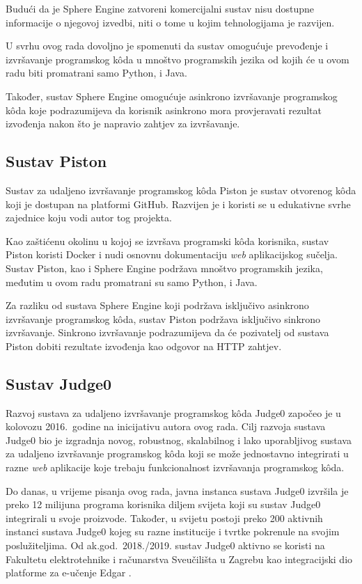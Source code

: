 \documentclass[times, utf8, diplomski]{fer}
\begin{document}
Budući da je Sphere Engine zatvoreni komercijalni sustav nisu dostupne informacije o njegovoj izvedbi, niti o tome u kojim tehnologijama je razvijen.

U svrhu ovog rada dovoljno je spomenuti da sustav omogućuje prevođenje i izvršavanje programskog kôda u mnoštvo programskih jezika od kojih će u ovom radu biti promatrani samo Python,  i Java.

Također, sustav Sphere Engine omogućuje asinkrono izvršavanje programskog kôda koje podrazumijeva da korisnik asinkrono mora provjeravati rezultat izvođenja nakon što je napravio zahtjev za izvršavanje.

\subsection{Sustav Piston}
Sustav za udaljeno izvršavanje programskog kôda Piston \citep{Piston} je sustav otvorenog kôda koji je dostupan na platformi GitHub. Razvijen je i koristi se u edukativne svrhe zajednice koju vodi autor tog projekta.

Kao zaštićenu okolinu u kojoj se izvršava programski kôda korisnika, sustav Piston koristi Docker \citep{merkel2014docker} i nudi osnovnu dokumentaciju \textit{web} aplikacijskog sučelja. Sustav Piston, kao i Sphere Engine podržava mnoštvo programskih jezika, međutim u ovom radu promatrani su samo Python,  i Java.

Za razliku od sustava Sphere Engine koji podržava isključivo asinkrono izvršavanje programskog kôda, sustav Piston podržava isključivo sinkrono izvršavanje. Sinkrono izvršavanje podrazumijeva da će pozivatelj od sustava Piston dobiti rezultate izvođenja kao odgovor na HTTP zahtjev.

\subsection{Sustav Judge0}
Razvoj sustava za udaljeno izvršavanje programskog kôda Judge0 \citep{9245310} započeo je u kolovozu 2016.\ godine na inicijativu autora ovog rada. Cilj razvoja sustava Judge0 bio je izgradnja novog, robustnog, skalabilnog i lako uporabljivog sustava za udaljeno izvršavanje programskog kôda koji se može jednostavno integrirati u razne \textit{web} aplikacije koje trebaju funkcionalnost izvršavanja programskog kôda.

Do danas, u vrijeme pisanja ovog rada, javna instanca sustava Judge0 izvršila je preko 12 milijuna programa korisnika diljem svijeta koji su sustav Judge0 integrirali u svoje proizvode. Također, u svijetu postoji preko 200 aktivnih instanci sustava Judge0 kojeg su razne institucije i tvrtke pokrenule na svojim poslužiteljima. Od ak.god.\ 2018./2019. sustav Judge0 aktivno se koristi na Fakultetu elektrotehnike i računarstva Sveučilišta u Zagrebu kao integracijski dio platforme za e-učenje Edgar \citep{mekterovic2020building}.
\end{document}
